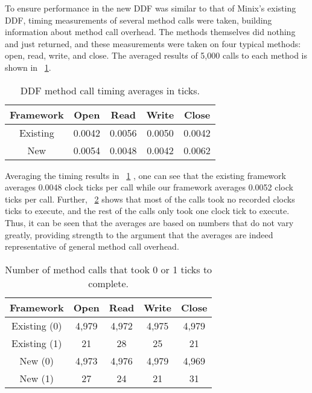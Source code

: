 To ensure performance in the new DDF was similar to that of Minix's existing
DDF, timing measurements of several method calls were taken,
building information about method call overhead.  The methods themselves
did nothing and just returned, and these measurements were taken on four
typical methods: {\important open, read, write}, and {\important close}. 
The averaged results of
5,000 calls to each method is shown in \tablename~\ref{tab:results}.

	\begin{table}[tb]
	\begin{center}
	\begin{tabular}{|c|c|c|c|c|}
	\hline
	  \bf Framework & \bf Open & \bf Read & \bf Write & \bf Close\\
	\hline
	  Existing & 0.0042 & 0.0056 & 0.0050 &
	  0.0042 \\
	  New & 0.0054 & 0.0048 & 0.0042 &
	  0.0062 \\
	\hline
	\end{tabular}
	\end{center}
	\caption{DDF method call timing averages in ticks.}
	\label{tab:results}
	\end{table}

Averaging the timing results in \tablename~\ref{tab:results}
, one can see
that the existing framework averages 0.0048 clock ticks per call while our framework averages 0.0052 clock ticks per call.  Further, 
\tablename~\ref{tab:result_errors} shows that most of the calls took
no recorded clocks ticks to execute, and the rest of the calls only took
one clock tick to execute.  Thus, it can be seen that the averages are
based on numbers that do not vary greatly, providing strength to the
argument that the averages are indeed representative of general method
call overhead.

	\begin{table}[tb]
	\begin{center}
	\begin{tabular}{|c|c|c|c|c|}
	\hline
	  \bf Framework & \bf Open & \bf Read & \bf Write & \bf Close\\
	\hline
	  Existing (0) & 4,979 & 4,972 & 4,975 & 4,979\\
	  Existing (1) & 21 & 28 & 25 & 21\\
	\hline
	  New (0) & 4,973 & 4,976 & 4,979 & 4,969\\
	  New (1) & 27 & 24 & 21 & 31\\
	\hline
	\end{tabular}
	\end{center}
	\caption{Number of method calls that took 0 or 1 ticks to complete.}
	\label{tab:result_errors}
	\end{table}

